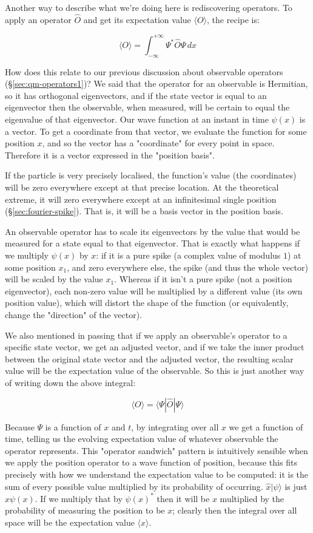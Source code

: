 Another way to describe what we're doing here is rediscovering operators. To apply an operator $\hat{O}$ and get its expectation value $\langle O \rangle$, the recipe is:

$$
\langle O \rangle =
\int_{-\infty}^{+\infty}
\Psi^*
\hat{O}
\Psi
\,dx
$$

How does this relate to our previous discussion about observable operators (§\ref{sec:qm-operators1})? We said that the operator for an observable is Hermitian, so it has orthogonal eigenvectors, and if the state vector is equal to an eigenvector then the observable, when measured, will be certain to equal the eigenvalue of that eigenvector. Our wave function at an instant in time $\psi(x)$ is a vector. To get a coordinate from that vector, we evaluate the function for some position $x$, and so the vector has a "coordinate" for every point in space. Therefore it is a vector expressed in the "position basis".

If the particle is very precisely localised, the function's value (the coordinates) will be zero everywhere except at that precise location. At the theoretical extreme, it will zero everywhere except at an infinitesimal single position (§\ref{sec:fourier-spike}). That is, it will be a basis vector in the position basis.

An observable operator has to scale its eigenvectors by the value that would be measured for a state equal to that eigenvector. That is exactly what happens if we multiply $\psi(x)$ by $x$: if it is a pure spike (a complex value of modulus $1$) at some position $x_1$, and zero everywhere else, the spike (and thus the whole vector) will be scaled by the value $x_1$. Whereas if it isn't a pure spike (not a position eigenvector), each non-zero value will be multiplied by a different value (its own position value), which will distort the shape of the function (or equivalently, change the "direction" of the vector).

We also mentioned in passing that if we apply an observable's operator to a specific state vector, we get an adjusted vector, and if we take the inner product between the original state vector and the adjusted vector, the resulting scalar value will be the expectation value of the observable. So this is just another way of writing down the above integral:

$$
\langle O \rangle =
\langle \Psi| \hat{O} | \Psi \rangle
$$

Because $\Psi$ is a function of $x$ and $t$, by integrating over all $x$ we get a function of time, telling us the evolving expectation value of whatever observable the operator represents. This "operator sandwich" pattern is intuitively sensible when we apply the position operator to a wave function of position, because this fits precisely with how we understand the expectation value to be computed: it is the sum of every possible value multiplied by its probability of occurring. $\hat{x}|\psi\rangle$ is just $x \psi(x)$. If we multiply that by $\psi(x)^*$ then it will be $x$ multiplied by the probability of measuring the position to be $x$; clearly then the integral over all space will be the expectation value $\langle x \rangle$.

